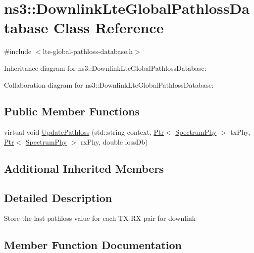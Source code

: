 \hypertarget{classns3_1_1DownlinkLteGlobalPathlossDatabase}{}\section{ns3\+:\+:Downlink\+Lte\+Global\+Pathloss\+Database Class Reference}
\label{classns3_1_1DownlinkLteGlobalPathlossDatabase}


{\ttfamily \#include $<$lte-\/global-\/pathloss-\/database.\+h$>$}



Inheritance diagram for ns3\+:\+:Downlink\+Lte\+Global\+Pathloss\+Database\+:


Collaboration diagram for ns3\+:\+:Downlink\+Lte\+Global\+Pathloss\+Database\+:
\subsection*{Public Member Functions}
\begin{DoxyCompactItemize}
\item 
virtual void \hyperlink{classns3_1_1DownlinkLteGlobalPathlossDatabase_ad7d9c4f30509e6486af64c99b717c24c}{Update\+Pathloss} (std\+::string context, \hyperlink{classns3_1_1Ptr}{Ptr}$<$ \hyperlink{classns3_1_1SpectrumPhy}{Spectrum\+Phy} $>$ tx\+Phy, \hyperlink{classns3_1_1Ptr}{Ptr}$<$ \hyperlink{classns3_1_1SpectrumPhy}{Spectrum\+Phy} $>$ rx\+Phy, double loss\+Db)
\end{DoxyCompactItemize}
\subsection*{Additional Inherited Members}


\subsection{Detailed Description}
Store the last pathloss value for each T\+X-\/\+RX pair for downlink 

\subsection{Member Function Documentation}
